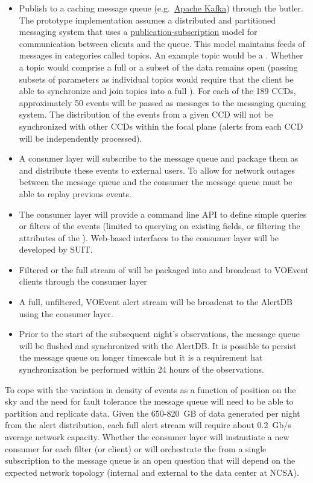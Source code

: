 \begin{itemize}
\item Publish \DIAObjects to a caching message queue (e.g.\ \href{http://kafka.apache.org}{Apache Kafka}) through the butler. The prototype implementation assumes a distributed and partitioned messaging system that uses a \href{https://en.wikipedia.org/wiki/Publish_subscribe_pattern}{publication-subscription} model for communication between clients and the queue. This model maintains feeds of messages in categories called topics. An example topic would be a \DIAObject. Whether a topic would comprise a full \DIAObject or a subset of the data remains open (passing subsets of parameters as individual topics would require that the client be able to synchronize and join topics into a full \DIAObject). For each of the 189 CCDs, approximately 50 events will be passed as messages to the messaging queuing system. The distribution of the events from a given CCD will not be synchronized with other CCDs within the focal plane (alerts from each CCD will be independently processed).

\item A consumer layer will subscribe to the  message queue and package them as \VOEvents and distribute these events to external users. To allow for network outages between the message queue and the consumer the message queue must be able to replay previous events.
\item  The consumer layer will provide a command line API to define simple queries or filters of the events (limited to querying on existing \DIAObject fields, or filtering the attributes of the \DIAObject). Web-based interfaces to the consumer layer will be developed by SUIT.
\item Filtered or the full stream of \DIAObjects will be packaged into \VOEvents and broadcast to VOEvent clients through the consumer layer
\item A full, unfiltered, VOEvent alert stream will be broadcast to the AlertDB using the consumer layer.
\item Prior to the start of the subsequent night's observations, the message queue will be flushed and synchronized with the AlertDB. It is possible to persist the message queue on longer timescale but it is a requirement hat synchronization be performed within 24 hours of the observations.
\end{itemize}

To cope with the variation in density of events as a function of position on the sky and the need for fault tolerance the message queue will need to be able to partition and replicate data. Given the 650-820~GB of data generated per night from the alert distribution, each full alert stream will require about 0.2~Gb/s average network capacity. Whether the consumer layer will instantiate a new consumer for each filter (or client) or will orchestrate the \VOEvents from a single subscription to the message queue is an open question that will depend on the expected network topology (internal and external to the data center at NCSA).

